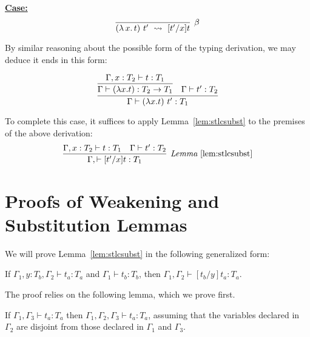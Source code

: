 \documentclass{article}
\providecommand{\betarule}[0]{\infer[\beta]{(\lambda\,x.\, t)\ t'\ \leadsto\ [t'/x]t}
                                {\ }}
\begin{document}
\noindent \underline{\textbf{Case:}}
\[
\betarule
\]

\noindent By similar reasoning about the possible form of the typing derivation, we may deduce
it ends in this form:

\[
\infer{\Gamma \vdash (\lambda x.t)\ t' : T_1}
       {\infer{\Gamma \vdash (\lambda x.t) : T_2\to T_1}
              {\Gamma, x : T_2 \vdash t : T_1} & \Gamma \vdash t' : T_2}
\]

\noindent To complete this case, it suffices to apply
Lemma~\ref{lem:stlcsubst} to the premises of the above derivation:
\[
\infer[\textit{Lemma}~\ref{lem:stlcsubst}]
      {\Gamma,\vdash [t'/x]t:T_1}
      {\Gamma, x : T_2 \vdash t : T_1 & \Gamma \vdash t' : T_2}
\]


\section{Proofs of Weakening and Substitution Lemmas}
\label{sec:stlcsubst}

We will prove Lemma~\ref{lem:stlcsubst} in the following generalized form:
\begin{lemma}[Substitution]
\label{lem:stlcsubsta}
If $\Gamma_1, y:T_b, \Gamma_2 \vdash t_a : T_a$ and $\Gamma_1 \vdash t_b : T_b$, then
$\Gamma_1,\Gamma_2 \vdash [t_b/y]t_a : T_a$.
\end{lemma}

The proof relies on the
following lemma, which we prove first.

\begin{lemma}[Weakening]
\label{lem:stlcweak}
If $\Gamma_1, \Gamma_3 \vdash t_a : T_a$ then $\Gamma_1, \Gamma_2,
\Gamma_3 \vdash t_a : T_a$, assuming that the variables declared in
$\Gamma_2$ are disjoint from those declared in $\Gamma_1$ and
$\Gamma_3$.
\end{lemma}
\end{document}

